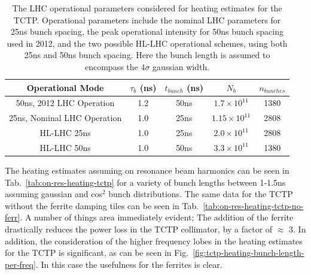 \begin{table}
\caption{The LHC operational parameters considered for heating estimates for the TCTP. Operational parameters include the nominal LHC parameters for 25ns bunch spacing, the peak operational intensity for 50ns bunch spacing used in 2012, and the two possible HL-LHC operational schemes, using both 25ns and 50ns bunch spacing. Here the bunch length is assumed to encompass the $4\sigma$ gaussian width.}
\label{tab:lhc-tctp-heating-para}
\begin{center}
\begin{tabular}{c | c | c | c | c }
Operational Mode & $\tau_{b}$ (ns) & $t_{bunch}$ (ns) & $N_{b}$ & $n_{bunches}$ \\ \hline
50ns, 2012 LHC Operation & 1.2 & 50ns & $1.7 \times 10^{11}$ & 1380 \\ \hline
25ns, Nominal LHC Operation & 1.0 & 25ns & $1.15 \times 10^{11}$ & 2808 \\ \hline
HL-LHC 25ns & 1.0 & 25ns & $2.0 \times 10^{11}$ & 2808 \\ \hline
HL-LHC 50ns & 1.0 & 50ns & $3.3 \times 10^{11}$ & 1380 \\ \hline
\end{tabular}
\end{center}
\end{table}

The heating estimates assuming on resonance beam harmonics can be seen in Tab.~\ref{tab:on-res-heating-tctp} for a variety of bunch lengths between 1-1.5ns assuming gaussian and cos$^{2}$ bunch distributions. The same data for the TCTP without the ferrite damping tiles can be seen in Tab.~\ref{tab:on-res-heating-tctp-no-ferr}. A number of things area immediately evident; 	The addition of the ferrite drastically reduces the power loss in the TCTP collimator, by a factor of $\approx$ 3. In addition, the consideration of the higher frequency lobes in the heating estimates for the TCTP is significant, as can be seen in Fig.~\ref{fig:tctp-heating-bunch-length-per-freq}. In this case the usefulness for the ferrites is clear.

